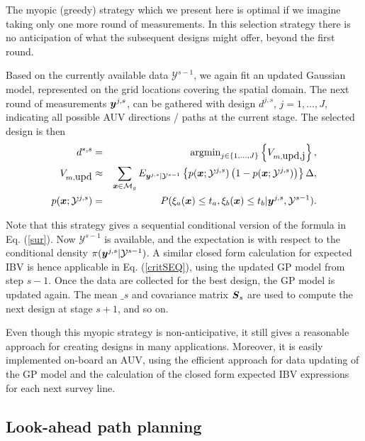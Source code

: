 \documentclass[aoas]{imsart}
\begin{document}
The myopic (greedy) strategy which we present here is optimal if we imagine taking only one more round of measurements. In this selection strategy there is no anticipation of what the subsequent designs might offer, beyond the first round. 

Based on the currently available data $\mathcal{Y}^{s-1}$, we again fit an updated Gaussian model, represented on the grid locations covering the spatial domain. 
The next round of measurements ${\boldsymbol y}^{j,s}$, can be gathered with design $d^{j,s}$, $j=1,\ldots,J$, indicating all possible AUV directions / paths at the current stage. The selected design is then
\begin{eqnarray}\label{critSEQ}
    d^{*,s} &=& \mbox{argmin}_{j \in \{1,\ldots,J\}} \left\{ V_{m,\mbox{upd,j}} \right\},  \\
V_{m,\mbox{upd}} & \approx & \sum_{\bx \in \mathcal{M}_g} E_{\by^{j,s}|\mathcal{Y}^{s-1}} \left\{ p(\bx;\mathcal{Y}^{j,s})\left( 1-p(\bx;\mathcal{Y}^{j,s})\right) \right\} \Delta, \nonumber \\
    p(\bx;\mathcal{Y}^{j,s}) &=& P(\xi_a(\bx) \leq t_a, \xi_b(\bx) \leq t_b |\by^{j,s},\mathcal{Y}^{s-1}). \nonumber
\end{eqnarray}

Note that this strategy gives a sequential conditional version of the formula in Eq. (\ref{sur}). Now $\mathcal{Y}^{s-1}$ is available, and the expectation is with respect to the conditional density $\pi({\boldsymbol y}^{j,s}|\mathcal{Y}^{s-1})$. A similar closed form calculation for expected IBV is hence applicable in Eq. (\ref{critSEQ}), using the updated GP model from step $s-1$. 
Once the data are collected for the best design, the GP model is updated again. The mean $\bm_{s}$ and covariance matrix ${\boldsymbol S}_{s}$ are used to compute the next design at stage $s+1$, and so on. 

Even though this myopic strategy is non-anticipative, it still gives a reasonable approach for creating designs in many applications. Moreover, it is easily implemented on-board an AUV, using the efficient approach for data updating of the GP model and the calculation of the closed form expected IBV expressions for each next survey line.


\subsection{Look-ahead path planning}
\label{LA}
\end{document}

